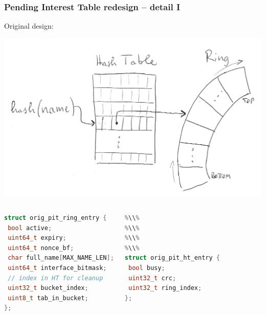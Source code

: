 \begin{frame}[fragile]
  \frametitle{Pending Interest Table redesign -- detail I}
  Original design:
  \vspace{-1.2cm}
  \begin{flushright}
    \includegraphics[width=.8\linewidth]{img/old_pit_sketch_trans.png}
  \end{flushright}
  \vspace{-2.7cm}
  \begin{columns}[t]
    \begin{lstlisting}[language=c,escapechar=\%]
struct orig_pit_ring_entry {
 bool active;
 uint64_t expiry;
 uint64_t nonce_bf;
 char full_name[MAX_NAME_LEN];
 uint64_t interface_bitmask;
 // index in HT for cleanup
 uint32_t bucket_index;
 uint8_t tab_in_bucket;
};
    \end{lstlisting}
    \begin{lstlisting}[language=c,escapechar=\%]
%\\%
%\\%
%\\%
%\\%
%\\%
struct orig_pit_ht_entry {
 bool busy;
 uint32_t crc;
 uint32_t ring_index;
};
    \end{lstlisting}
  \end{columns}
\end{frame}

